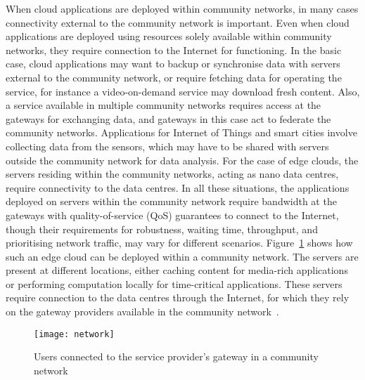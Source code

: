 

When cloud applications are deployed within community networks, 
in many cases connectivity external to the community network is important. 
Even when cloud applications are deployed using resources solely available within community networks, 
they require connection to the Internet for functioning.
In the basic case, cloud applications may want to backup or synchronise data with servers external to the community network,
or require fetching data for operating the service, for instance a video-on-demand service may download fresh content.
Also, a service available in multiple community networks requires access at the gateways for exchanging data, and gateways in this case act to federate the community networks.
Applications for Internet of Things and smart cities involve collecting data from the sensors, 
which may have to be shared with servers outside the community network for data analysis.
For the case of edge clouds, the servers residing within the community networks, acting as nano data centres, require connectivity to the data centres.
In all these situations, the applications deployed on servers within the community network require bandwidth at the gateways 
with quality-of-service (QoS) guarantees to connect to the Internet, 
though their requirements for robustness, waiting time, throughput, and prioritising network traffic, may vary for different scenarios.
Figure~\ref{fig__external_bandwith_mesh_network} shows how such an edge cloud can be deployed within a community network.
The servers are present at different locations, 
either caching content for media-rich applications or performing computation locally for time-critical applications.
These servers require connection to the data centres through the Internet,
for which they rely on the gateway providers available in the community network~\cite{Baig2015Guifi}.

\begin{figure}[tbp]
	\centering
	\texttt{[image: network]}
	\caption[Users connected to the service provider's gateway]{Users connected to the service provider's gateway in a community network}
	\label{fig__external_bandwith_mesh_network}
\end{figure} 

